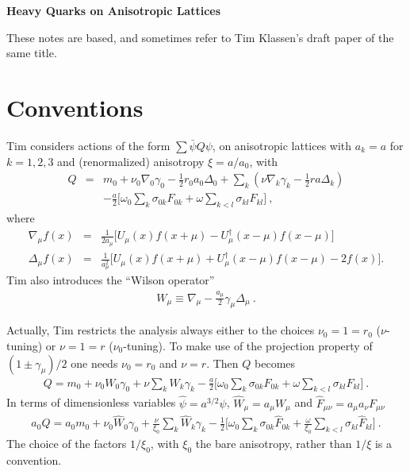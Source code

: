 \documentclass[12pt]{article}
\begin{document}
\newcommand{\half}{\frac{1}{2}}
\newcommand{\be}{\begin{displaymath}}
\newcommand{\ee}{\end{displaymath}}
\newcommand{\bea}{\begin{eqnarray}}
\newcommand{\eea}{\end{eqnarray}}
\newcommand{\bdm}{\begin{displaymath}}
\newcommand{\edm}{\end{displaymath}}
\newcommand{\<}{\langle}
\renewcommand{\>}{\rangle}
\newcommand{\Tr}{\mbox{Tr}}

\centerline{\bf \Large Heavy Quarks on Anisotropic Lattices}
\vskip 5mm

These notes are based, and sometimes refer to Tim Klassen's draft paper
of the same title.

\section{Conventions}

Tim considers actions of the form $\sum \bar \psi Q \psi$, on anisotropic
lattices with $a_k=a$ for $k=1,2,3$ and (renormalized) anisotropy
$\xi = a / a_0$, with
\bea
Q &=& m_0 + \nu_0 \nabla_0 \gamma_0 - \half r_0 a_0 \Delta_0
 + \sum_k \left( \nu \nabla_k \gamma_k- \half r a \Delta_k \right) \nonumber \\
&& - \frac{a}{2} \Big[ \omega_0 \sum_k \sigma_{0k} F_{0k}
 + \omega \sum_{k<l} \sigma_{kl} F_{kl} \Big ] ~,
\label{eq:Q_generic}
\eea
where
\bea
\nabla_\mu f(x) &=& \frac{1}{2a_\mu} \bigg[ U_\mu(x) f(x+\mu) -
 U^\dagger_\mu(x-\mu) f(x-\mu) \bigg ] \\
\Delta_\mu f(x) &=& \frac{1}{a_\mu^2} \bigg[ U_\mu(x) f(x+\mu) +
 U^\dagger_\mu(x-\mu) f(x-\mu) - 2f(x) \bigg ] .
\eea
Tim also introduces the ``Wilson operator''
\bea
W_\mu \equiv \nabla_\mu - \frac{a_\mu}{2} \gamma_\mu \Delta_\mu ~.
\eea

Actually, Tim restricts the analysis always either to the choices
$\nu_0 = 1 = r_0$ ($\nu$-tuning) or $\nu = 1 = r$ ($\nu_0$-tuning).
To make use of the projection property of $(1 \pm \gamma_\mu)/2$
one needs $\nu_0 = r_0$ and $\nu = r$. Then $Q$ becomes
\bea
Q = m_0 + \nu_0 W_0 \gamma_0 + \nu \sum_k W_k \gamma_k
 - \frac{a}{2} \bigg[ \omega_0 \sum_k \sigma_{0k} F_{0k}
 + \omega \sum_{k<l} \sigma_{kl} F_{kl} \bigg ] ~.
\label{eq:Q_W}
\eea
In terms of dimensionless variables $\hat \psi = a^{3/2} \psi$,
$\hat W_\mu = a_\mu W_\mu$ and $\hat F_{\mu\nu} = a_\mu a_\nu F_{\mu\nu}$
\bea
a_0 Q = a_0 m_0 + \nu_0 \hat W_0 \gamma_0 +
 \frac{\nu}{\xi_0} \sum_k \hat W_k \gamma_k -
 \half \bigg[ \omega_0 \sum_k \sigma_{0k} \hat F_{0k} +
 \frac{\omega}{\xi_0} \sum_{k<l} \sigma_{kl} \hat F_{kl} \bigg ] ~.
\label{eq:Q_Tim}
\eea
The choice of the factors $1/\xi_0$, with $\xi_0$ the bare anisotropy,
rather than $1/\xi$ is a convention.
\end{document}
